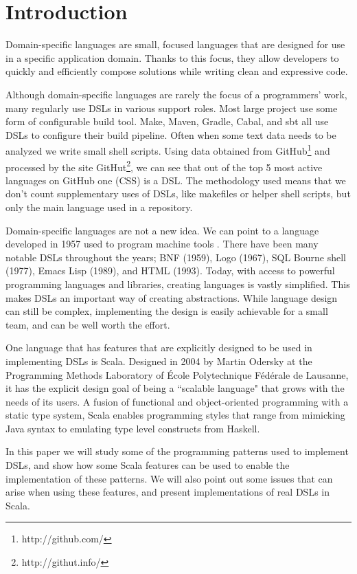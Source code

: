\chapter{Introduction}

Domain-specific languages are small, focused languages that are designed for use in a specific application domain.
Thanks to this focus, they allow developers to quickly and efficiently compose solutions while writing clean and expressive code.

Although domain-specific languages are rarely the focus of a programmers' work, many regularly use DSLs in various support roles.
Most large project use some form of configurable build tool.
Make, Maven, Gradle, Cabal, and sbt all use DSLs to configure their build pipeline.
Often when some text data needs to be analyzed we write small shell scripts.
Using data obtained from GitHub\footnote{http://github.com/} and processed by the site GitHut\footnote{http://githut.info/}, we can see that out of the top 5 most active languages on GitHub one (CSS) is a DSL.
The methodology used means that we don't count supplementary uses of DSLs, like makefiles or helper shell scripts, but only the main language used in a repository.

Domain-specific languages are not a new idea.
We can point to a language developed in 1957 used to program machine tools \cite{Ross:1978}.
There have been many notable DSLs throughout the years; BNF (1959), Logo (1967), SQL Bourne shell (1977), Emacs Lisp (1989), and HTML (1993).
Today, with access to powerful programming languages and libraries, creating languages is vastly simplified.
This makes DSLs an important way of creating abstractions.
While language design can still be complex, implementing the design is easily achievable for a small team, and can be well worth the effort.

One language that has features that are explicitly designed to be used in implementing DSLs is Scala.
Designed in 2004 by Martin Odersky at the Programming Methods Laboratory of \'Ecole Polytechnique F\'ed\'erale de Lausanne, it has the explicit design goal of being a ``scalable language" that grows with the needs of its users.
A fusion of functional and object-oriented programming with a static type system, Scala enables programming styles that range from mimicking Java syntax to emulating type level constructs from Haskell.

In this paper we will study some of the programming patterns used to implement DSLs, and show how some Scala features can be used to enable the implementation of these patterns.
We will also point out some issues that can arise when using these features, and present implementations of real DSLs in Scala.